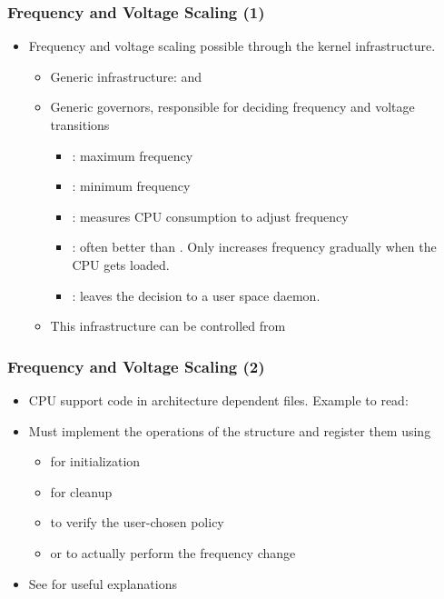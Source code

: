 \begin{frame}
  \frametitle{Frequency and Voltage Scaling (1)}
  \begin{itemize}
  \item Frequency and voltage scaling possible through the
     kernel infrastructure.
    \begin{itemize}
    \item Generic infrastructure:  and
    \item Generic governors, responsible for deciding frequency and
      voltage transitions
      \begin{itemize}
      \item {}: maximum frequency
      \item {}: minimum frequency
      \item {}: measures CPU consumption to adjust frequency
      \item {}: often better than
        . Only increases frequency gradually when the
        CPU gets loaded.
      \item {}: leaves the decision to a user space
        daemon.
      \end{itemize}
    \item This infrastructure can be controlled from
    \end{itemize}
  \end{itemize}
\end{frame}

\begin{frame}
  \frametitle{Frequency and Voltage Scaling (2)}
  \begin{itemize}
  \item CPU support code in architecture dependent files.  Example to
    read: 
  \item Must implement the operations of the 
    structure and register them using 
    \begin{itemize}
    \item {} for initialization
    \item {} for cleanup
    \item {} to verify the user-chosen policy
    \item {} or  to actually perform
      the frequency change
    \end{itemize}
  \item See  for useful explanations
  \end{itemize}
\end{frame}

